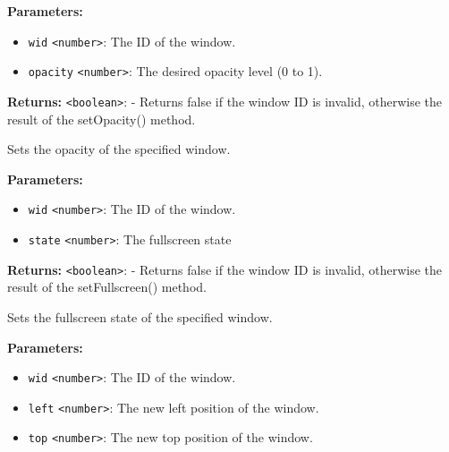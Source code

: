\documentclass[12pt,a4paper]{article}
\begin{document}
\vspace{5mm}
\noindent {}


\noindent \textbf{Parameters:}
\begin{itemize}
  \item \texttt{wid} \texttt{<number>}: The ID of the window.
  \item \texttt{opacity} \texttt{<number>}: The desired opacity level (0 to 1).
\end{itemize}

\noindent \textbf{Returns:} \texttt{<boolean>}: - Returns false if the window ID is invalid, otherwise the result of the setOpacity() method.

\noindent Sets the opacity of the specified window.

\vspace{5mm}
\noindent {}


\noindent \textbf{Parameters:}
\begin{itemize}
  \item \texttt{wid} \texttt{<number>}: The ID of the window.
  \item \texttt{state} \texttt{<number>}: The fullscreen state
\end{itemize}

\noindent \textbf{Returns:} \texttt{<boolean>}: - Returns false if the window ID is invalid, otherwise the result of the setFullscreen() method.

\noindent Sets the fullscreen state of the specified window.

\vspace{5mm}
\noindent {}


\noindent \textbf{Parameters:}
\begin{itemize}
  \item \texttt{wid} \texttt{<number>}: The ID of the window.
  \item \texttt{left} \texttt{<number>}: The new left position of the window.
  \item \texttt{top} \texttt{<number>}: The new top position of the window.
\end{itemize}
\end{document}
